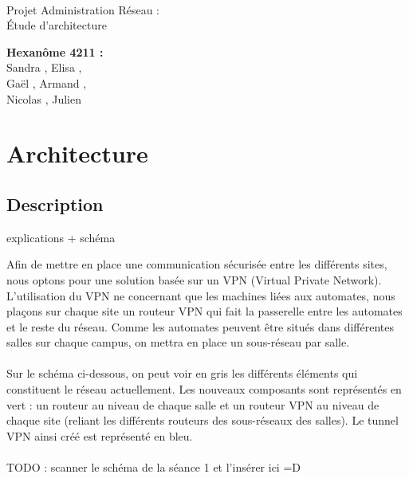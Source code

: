 \documentclass[a4paper]{article}
\begin{document}
\begin{titlepage}
	~ 
	\vfill
	\begin{center}
		\begin{Huge}
			Projet Administration Réseau : \\ Étude d'architecture\\
		\end{Huge}
	\vfill
		\textbf{Hexanôme 4211 :} 
			\\Sandra {}, Elisa , 
			\\Gaël , Armand , 
			\\Nicolas {}, Julien \\
	\vfill
	\end{center}
	\vfill
\end{titlepage}

\newpage
\tableofcontents
\newpage

\section{Architecture}
	\subsection{Description}
	explications + schéma 
	
	Afin de mettre en place une communication sécurisée entre les différents sites, nous optons pour une solution basée sur un VPN (Virtual Private Network). L'utilisation du VPN ne concernant que les machines liées aux automates, nous plaçons sur chaque site un routeur VPN qui fait la passerelle entre les automates et le reste du réseau. Comme les automates peuvent être situés dans différentes salles sur chaque campus, on mettra en place un sous-réseau par salle. 
	\paragraph*{}
	Sur le schéma ci-dessous, on peut voir en gris les différents éléments qui constituent le réseau actuellement. Les nouveaux composants sont représentés en vert : un routeur au niveau de chaque salle et un routeur VPN au niveau de chaque site (reliant les différents routeurs des sous-réseaux des salles). Le tunnel VPN ainsi créé est représenté en bleu. 
	\paragraph*{}
	TODO : scanner le schéma de la séance 1 et l'insérer ici =D 
	
\end{document}
